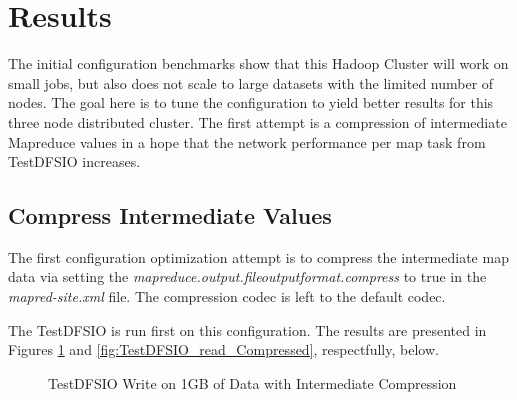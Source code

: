 \documentclass[10pt,journal,compsoc,float]{IEEEtran}
\begin{document}
\section{Results}
\label{sec:results}

The initial configuration benchmarks show that this Hadoop Cluster will work on small jobs, but also does not scale to large datasets with the limited number of nodes. The goal here is to tune the configuration to yield better results for this three node distributed cluster. The first attempt is a compression of intermediate Mapreduce values in a hope that the network performance per map task from TestDFSIO increases.

\subsection{Compress Intermediate Values}
\label{sec:results_compressed}
The first configuration optimization attempt is to compress the intermediate map data via setting the  \textit{mapreduce.output.fileoutputformat.compress} to true in the \textit{mapred-site.xml} file. The compression codec is left to the default codec. 

The TestDFSIO is run first on this configuration. The results are presented in Figures \ref{fig:TestDFSIO_write_Compressed} and \ref{fig:TestDFSIO_read_Compressed}, respectfully, below.

\writedataCompressed

\begin{figure}[H]
	\centering
	\caption{TestDFSIO Write on 1GB of Data with Intermediate Compression}
	\label{fig:TestDFSIO_write_Compressed}
\end{figure}
\end{document}
